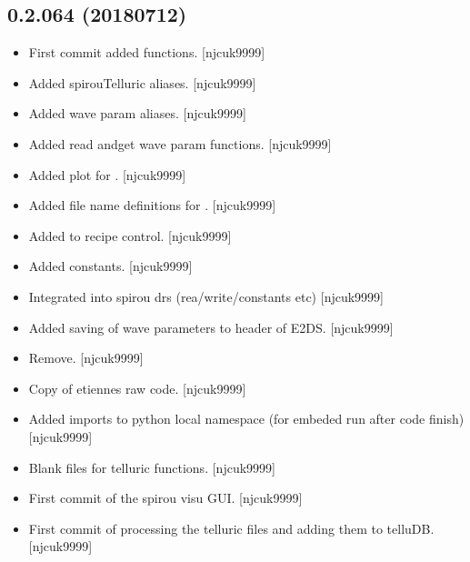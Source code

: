 \documentclass[a4paper,10pt,english]{report}
\begin{document}
\subsection{0.2.064 (2018\sphinxhyphen{}07\sphinxhyphen{}12)}
\label{\detokenize{misc/changelog:id414}}\begin{itemize}
\item {} 
First commit \sphinxhyphen{} added  functions. {[}njcuk9999{]}

\item {} 
Added spirouTelluric aliases. {[}njcuk9999{]}

\item {} 
Added wave param aliases. {[}njcuk9999{]}

\item {} 
Added read andget wave param functions. {[}njcuk9999{]}

\item {} 
Added plot for . {[}njcuk9999{]}

\item {} 
Added file name definitions for . {[}njcuk9999{]}

\item {} 
Added  to recipe control. {[}njcuk9999{]}

\item {} 
Added  constants. {[}njcuk9999{]}

\item {} 
Integrated  into spirou drs (rea/write/constants etc)
{[}njcuk9999{]}

\item {} 
Added saving of wave parameters to header of E2DS. {[}njcuk9999{]}

\item {} 
Remove. {[}njcuk9999{]}

\item {} 
Copy of etiennes raw  code. {[}njcuk9999{]}

\item {} 
Added imports to python local namespace (for embeded run after code
finish) {[}njcuk9999{]}

\item {} 
Blank files for telluric functions. {[}njcuk9999{]}

\item {} 
First commit of the spirou visu GUI. {[}njcuk9999{]}

\item {} 
First commit of  \sphinxhyphen{} processing the telluric files and
adding them to telluDB. {[}njcuk9999{]}

\end{itemize}
\end{document}
